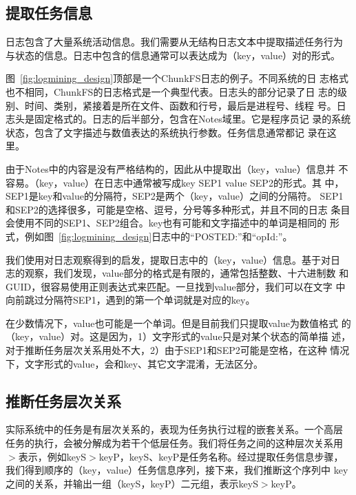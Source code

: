 \subsection{提取任务信息}

日志包含了大量系统活动信息。我们需要从无结构日志文本中提取描述任务行为
与状态的信息。日志中包含的信息通常可以表达成为（key，value）对的形式。

图~\ref{fig:logmining_design}顶部是一个ChunkFS日志的例子。不同系统的日
志格式也不相同，ChunkFS的日志格式是一个典型代表。日志头的部分记录了日
志的级别、时间、类别，紧接着是所在文件、函数和行号，最后是进程号、线程
号。日志头是固定格式的。日志的后半部分，包含在Notes域里。它是程序员记
录的系统状态，包含了文字描述与数值表达的系统执行参数。任务信息通常都记
录在这里。

由于Notes中的内容是没有严格结构的，因此从中提取出（key，value）信息并
不容易。（key，value）在日志中通常被写成key SEP1 value SEP2的形式。其
中，SEP1是key和value的分隔符，SEP2是两个（key，value）之间的分隔符。
SEP1和SEP2的选择很多，可能是空格、逗号，分号等多种形式，并且不同的日志
条目会使用不同的SEP1、SEP2组合。key也有可能和文字描述中的单词是相同的
形式，例如图~\ref{fig:logmining_design}日志中的“POSTED:”和“opId:”。

我们使用对日志观察得到的启发，提取日志中的（key，value）信息。基于对日
志的观察，我们发现，value部分的格式是有限的，通常包括整数、十六进制数
和GUID，很容易使用正则表达式来匹配。一旦找到value部分，我们可以在文字
中向前跳过分隔符SEP1，遇到的第一个单词就是对应的key。

在少数情况下，value也可能是一个单词。但是目前我们只提取value为数值格式
的（key，value）对。这是因为，1）文字形式的value只是对某个状态的简单描
述，对于推断任务层次关系用处不大，2）由于SEP1和SEP2可能是空格，在这种
情况下，文字形式的value，会和key、其它文字混淆，无法区分。

\subsection{推断任务层次关系}

实际系统中的任务是有层次关系的，表现为任务执行过程的嵌套关系。一个高层
任务的执行，会被分解成为若干个低层任务。我们将任务之间的这种层次关系用
$>$表示，例如keyS$>$keyP，keyS、keyP是任务名称。经过提取任务信息步骤，
我们得到顺序的（key，value）任务信息序列，接下来，我们推断这个序列中
key之间的关系，并输出一组（keyS，keyP）二元组，表示keyS$>$keyP。



